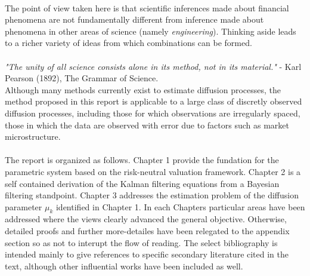 \documentclass{article}
\theoremstyle{definition}
\theoremstyle{remark}
\begin{document}
\\
The point of view taken here is that scientific inferences made about financial phenomena are not fundamentally different from inference made about phenomena in other areas of science (namely \emph{engineering}). Thinking aside leads to a richer variety of ideas from which combinations can be formed.\\
\\
\textit{"The unity of all science consists alone in its method, not in its material."} - Karl Pearson (1892), The Grammar of Science.
\\



Although many methods currently exist to estimate diffusion processes, the method proposed in this report is applicable to a large class of discretly observed diffusion processes, including those for which observations are irregularly spaced, those in which the data are observed with error due to factors such as market microstructure. \\
\\
The report is organized as follows. Chapter 1 provide the fundation for the parametric system based on the risk-neutral valuation framework. Chapter 2 is a self contained derivation of the Kalman filtering equations from a Bayesian filtering standpoint. Chapter 3 addresses the estimation problem of the diffusion parameter $\mu_k$ identified in Chapter 1. In each Chapters particular areas have been addressed where the views clearly advanced the general objective. Otherwise, detailed proofs and further more-detailes have been relegated to the appendix section so as not to interupt the flow of reading.
The select bibliography is intended mainly to give references to specific secondary literature cited in the text, although other influential works have been included as well. 
\end{document}
